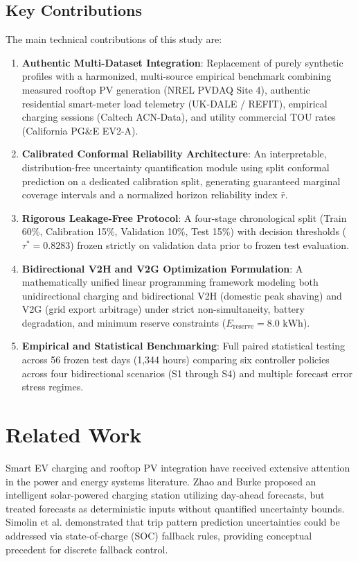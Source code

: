 \documentclass[conference]{IEEEtran}
\begin{document}
\subsection{Key Contributions}
The main technical contributions of this study are:
\begin{enumerate}
    \item \textbf{Authentic Multi-Dataset Integration}: Replacement of purely synthetic profiles with a harmonized, multi-source empirical benchmark combining measured rooftop PV generation (NREL PVDAQ Site 4), authentic residential smart-meter load telemetry (UK-DALE / REFIT), empirical charging sessions (Caltech ACN-Data), and utility commercial TOU rates (California PG\&E EV2-A).
    \item \textbf{Calibrated Conformal Reliability Architecture}: An interpretable, distribution-free uncertainty quantification module using split conformal prediction on a dedicated calibration split, generating guaranteed marginal coverage intervals and a normalized horizon reliability index $\bar{r}$.
    \item \textbf{Rigorous Leakage-Free Protocol}: A four-stage chronological split (Train 60\%, Calibration 15\%, Validation 10\%, Test 15\%) with decision thresholds ($\tau^* = 0.8283$) frozen strictly on validation data prior to frozen test evaluation.
    \item \textbf{Bidirectional V2H and V2G Optimization Formulation}: A mathematically unified linear programming framework modeling both unidirectional charging and bidirectional V2H (domestic peak shaving) and V2G (grid export arbitrage) under strict non-simultaneity, battery degradation, and minimum reserve constraints ($E_{\text{reserve}} = 8.0\text{ kWh}$).
    \item \textbf{Empirical and Statistical Benchmarking}: Full paired statistical testing across 56 frozen test days (1,344 hours) comparing six controller policies across four bidirectional scenarios (S1 through S4) and multiple forecast error stress regimes.
\end{enumerate}

\section{Related Work}
Smart EV charging and rooftop PV integration have received extensive attention in the power and energy systems literature. Zhao and Burke \cite{zhao2014intelligent} proposed an intelligent solar-powered charging station utilizing day-ahead forecasts, but treated forecasts as deterministic inputs without quantified uncertainty bounds. Simolin et al. \cite{simolin2020assessment} demonstrated that trip pattern prediction uncertainties could be addressed via state-of-charge (SOC) fallback rules, providing conceptual precedent for discrete fallback control.
\end{document}
